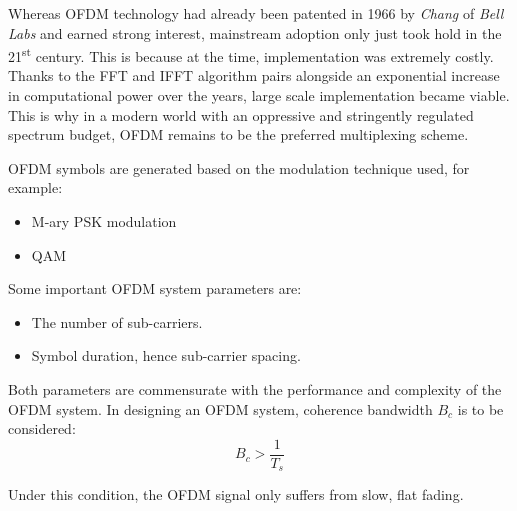 Whereas \gls{OFDM} technology had already been patented in 1966 by \emph{Chang} of \emph{Bell Labs}\cite{ofdm_intro} and earned strong interest, mainstream adoption only just took hold in the 21\textsuperscript{st} century. This is because at the time, implementation was extremely costly.
Thanks to the \gls{FFT} and \gls{IFFT} algorithm pairs alongside an exponential increase in computational power over the years, large scale implementation became viable. This is why in a modern world with an oppressive and stringently regulated spectrum budget, \gls{OFDM} remains to be the preferred multiplexing scheme.

\gls{OFDM} symbols are generated based on the modulation technique used, for example:
\begin{itemize}
	\item M-ary \gls{PSK} modulation
	\item \gls{QAM}
\end{itemize}
Some important \gls{OFDM} system parameters are:
\begin{itemize}
	\item The number of sub-carriers.
	\item Symbol duration, hence sub-carrier spacing.
\end{itemize}
Both parameters are commensurate with the performance and complexity of the \gls{OFDM} system\cite{wireless_design}. In designing an \gls{OFDM} system, coherence bandwidth \(B_c\) is to be considered:
\[
	B_c > \frac{1}{T_s}
\]
\begin{mathDef}
\end{mathDef}
Under this condition, the OFDM signal only suffers from slow, flat fading.
